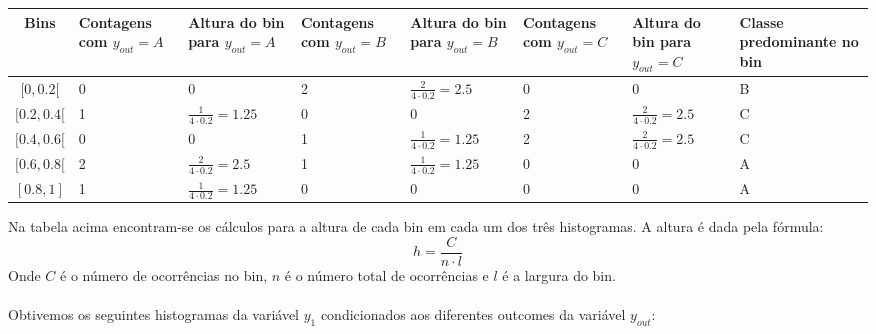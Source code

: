 \documentclass{article}
\begin{document}
\begin{table}[H]
  \centering
  \begin{tabular}{|c|w{1.8cm}|w{1.8cm}|w{1.8cm}|w{1.8cm}|w{1.8cm}|w{1.8cm}|w{1.8cm}|}
    \hline
    Bins & Contagens com $y_{out} = A$ & Altura do bin para $y_{out} = A$ & Contagens com $y_{out} = B$ & Altura do bin para $y_{out} = B$ & Contagens com $y_{out} = C$ & Altura do bin para $y_{out} = C$ & Classe predominante no bin \\ \hline
    $[0,0.2[$       &  0             & 0                              & 2 & $\frac{2}{4\cdot 0.2} = 2.5$    & 0 & 0                   & B \\ \hline
    $[0.2,0.4[$     &  1             & $\frac{1}{4 \cdot 0.2} = 1.25$ & 0 & 0                               & 2 & $\frac{2}{4\cdot 0.2} = 2.5$ & C \\ \hline
    $[0.4,0.6[$     &  0             & 0                              & 1 & $\frac{1}{4\cdot 0.2} = 1.25$   & 2 & $\frac{2}{4\cdot 0.2} = 2.5$ & C \\ \hline
    $[0.6,0.8[$     &  2             & $\frac{2}{4\cdot 0.2}=2.5$     & 1 & $\frac{1}{4\cdot 0.2} = 1.25$   & 0 & 0                   & A \\ \hline
    $[0.8,1]$       &  1             & $\frac{1}{4\cdot 0.2} = 1.25$  & 0 & 0                               & 0 & 0                   & A \\ \hline
  \end{tabular}
  \label{tab:c_bins}
\end{table}

Na tabela acima encontram-se os cálculos para a altura de cada bin em cada um dos três histogramas. 
A altura é dada pela fórmula:
\[ h = \frac{C}{n\cdot l} \]
Onde $C$ é o número de ocorrências no bin, $n$ é o número total de ocorrências e $l$ é a largura do bin.

\paragraph{}

Obtivemos os seguintes histogramas da variável $y_1$ condicionados aos diferentes outcomes da variável $y_{out}$:
\end{document}
